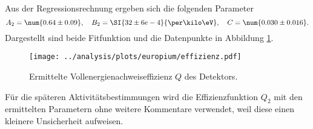 Aus der Regressionsrechnung ergeben sich die folgenden Parameter
\begin{equation}
\label{eq:effizienz_Q_2}
A_2 = \num{0.64\pm0.09}, \quad B_2=\SI{32\pm6 e-4}{\per\kilo\eV}, \quad C = \num{0.030\pm0.016}.
\end{equation}
Dargestellt sind beide Fitfunktion und die Datenpunkte in Abbildung \ref{fig:effizienz}.
\begin{figure}
  \centering
  \texttt{[image: ../analysis/plots/europium/effizienz.pdf]}
  \caption{Ermittelte Vollenergienachweiseffizienz $Q$ des Detektors.}
  \label{fig:effizienz}
\end{figure}
Für die späteren Aktivitätsbestimmungen wird die Effizienzfunktion $Q_2$ mit den
ermittelten Parametern ohne weitere Kommentare verwendet, weil diese einen kleinere
Unsicherheit aufweisen.
\FloatBarrier
